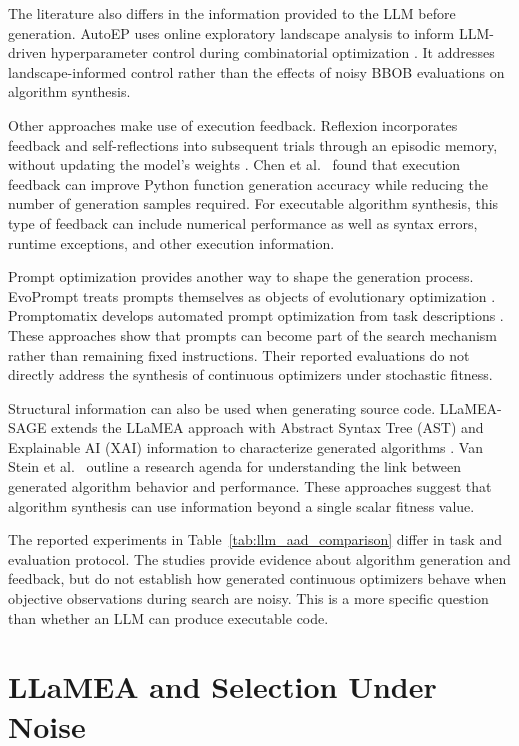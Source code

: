 The literature also differs in the information provided to the LLM before
generation. AutoEP uses online exploratory landscape analysis to inform
LLM-driven hyperparameter control during combinatorial optimization
\cite{AutoEP2026}. It addresses landscape-informed control rather than the
effects of noisy BBOB evaluations on algorithm synthesis.

Other approaches make use of execution feedback. Reflexion incorporates
feedback and self-reflections into subsequent trials through an episodic
memory, without updating the model's weights \cite{Shinn2023}.
Chen et al.\ \cite{Chen2023} found that execution feedback can improve Python function
generation accuracy while reducing the number of generation samples required.
For executable algorithm synthesis, this type of feedback can include
numerical performance as well as syntax errors, runtime exceptions, and
other execution information.

Prompt optimization provides another way to shape the generation process.
EvoPrompt treats prompts themselves as objects of evolutionary optimization
\cite{Guo2023}. Promptomatix develops automated prompt optimization from task
descriptions \cite{Murthy2025}. These approaches show that prompts can become
part of the search mechanism rather than remaining fixed instructions. Their
reported evaluations do not directly address the synthesis of continuous
optimizers under stochastic fitness.

Structural information can also be used when generating source code.
LLaMEA-SAGE extends the LLaMEA approach with Abstract Syntax Tree (AST) and
Explainable AI (XAI) information to characterize generated algorithms
\cite{LLaMEASAGE2026}. Van Stein et al.\ \cite{vanStein2025} outline a research
agenda for understanding the link between generated algorithm behavior and
performance. These approaches suggest that algorithm synthesis can use
information beyond a single scalar fitness value.

The reported experiments in Table~\ref{tab:llm_aad_comparison} differ in
task and evaluation protocol. The studies provide evidence about algorithm
generation and feedback, but do not establish how generated continuous
optimizers behave when objective observations during search are noisy. This
is a more specific question than whether an LLM can produce executable code.

\section{LLaMEA and Selection Under Noise}
\label{sec:selection_under_noise}

